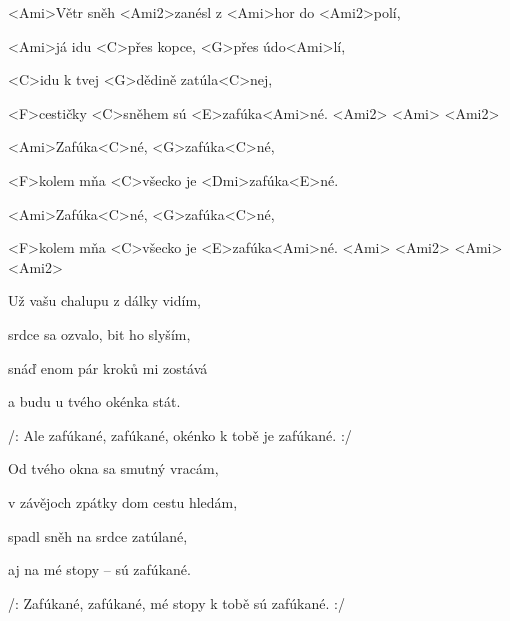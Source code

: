 

\zs
<Ami>Větr sněh <Ami2>zanésl z <Ami>hor do <Ami2>polí,

<Ami>já idu <C>přes kopce, <G>přes údo<Ami>lí,

<C>idu k tvej <G>dědině zatúla<C>nej,

<F>cestičky <C>sněhem sú <E>zafúka<Ami>né.
<Ami2> <Ami> <Ami2>
\ks

\zr
<Ami>Zafúka<C>né, <G>zafúka<C>né,

<F>kolem mňa <C>všecko je <Dmi>zafúka<E>né.

<Ami>Zafúka<C>né, <G>zafúka<C>né,

<F>kolem mňa <C>všecko je <E>zafúka<Ami>né.
<Ami> <Ami2> <Ami> <Ami2>
\kr

\zs
Už vašu chalupu z dálky vidím,

srdce sa ozvalo, bit ho slyším,

snáď enom pár kroků mi zostává

a budu u tvého okénka stát.
\ks

\zr
/: Ale zafúkané, zafúkané, okénko k tobě je zafúkané. :/
\kr

\zs
Od tvého okna sa smutný vracám,

v závějoch zpátky dom cestu hledám,

spadl sněh na srdce zatúlané,

aj na mé stopy -- sú zafúkané.
\ks

\zr
/: Zafúkané, zafúkané, mé stopy k tobě sú zafúkané. :/
\kr







\kp
